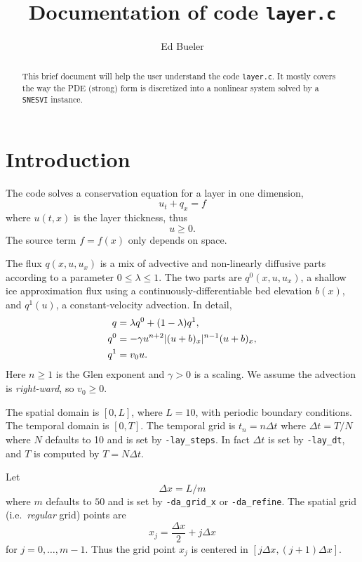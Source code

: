 \documentclass[11pt]{amsart}
\title{Documentation of code \texttt{layer.c}}
\author{Ed Bueler}
\begin{document}
\begin{abstract}
This brief document will help the user understand the code \texttt{layer.c}.  It mostly covers the way the PDE (strong) form is discretized into a nonlinear system solved by a \texttt{SNESVI} instance.
\end{abstract}

\maketitle

\thispagestyle{empty}

\baselineskip=14pt
\parskip=7pt

\section{Introduction}

The code solves a conservation equation for a layer in one dimension,
\begin{equation}
u_t + q_x = f  \label{eq:conserve}
\end{equation}
where $u(t,x)$ is the layer thickness, thus
\begin{equation}
u \ge 0. \label{eq:constraint}
\end{equation}
The source term $f=f(x)$ only depends on space.

The flux $q(x,u,u_x)$ is a mix of advective and non-linearly diffusive parts according to a parameter $0\le \lambda \le 1$.  The two parts are $q^0(x,u,u_x)$, a shallow ice approximation flux using a continuously-differentiable bed elevation $b(x)$, and $q^1(u)$, a constant-velocity advection.  In detail,
\begin{align}
    q &= \lambda q^0 + (1-\lambda) q^1,  \label{eq:fluxform} \\
  q^0 &= - \gamma u^{n+2} |(u+b)_x|^{n-1} (u+b)_x, \notag \\
  q^1 &= v_0 u. \notag
\end{align}
Here $n\ge 1$ is the Glen exponent and $\gamma>0$ is a scaling.  We assume the advection is \emph{right-ward}, so $v_0 \ge 0$.

The spatial domain is $[0,L]$, where $L=10$, with periodic boundary conditions.  The temporal domain is $[0,T]$.  The temporal grid is $t_n = n\Delta t$ where $\Delta t = T/N$ where $N$ defaults to 10 and is set by \verb|-lay_steps|.  In fact $\Delta t$ is set by \verb|-lay_dt|, and $T$ is computed by $T=N\Delta t$.

Let
  $$\Delta x = L / m$$
where $m$ defaults to $50$ and is set by \verb|-da_grid_x| or \verb|-da_refine|.  The spatial grid (i.e.~\emph{regular} grid) points are
    $$x_j = \frac{\Delta x}{2} + j \Delta x$$
for $j=0,\dots,m-1$.  Thus the grid point $x_j$ is centered in $[j\Delta x,(j+1)\Delta x]$.
\end{document}
